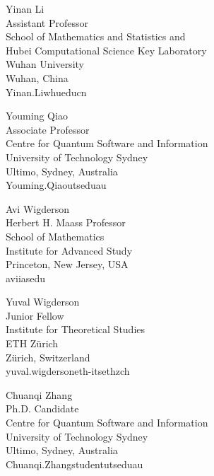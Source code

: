 \documentclass{toc}
\theoremstyle{plain}
\numberwithin{equation}{section}
\theoremstyle{definition}
\begin{document}
%
%
%
%
%
\begin{tocauthors}
\begin{tocinfo}[Li]
 Yinan Li\\
 Assistant Professor\\
 School of Mathematics and Statistics and \\
 Hubei Computational Science Key Laboratory\\
 Wuhan University\\
 Wuhan, China\\
 Yinan.Li\tocat{}whu\tocdot{}edu\tocdot{}cn \\   %
\end{tocinfo}
\begin{tocinfo}[Qiao]
  Youming Qiao\\
  Associate Professor\\
  Centre for Quantum Software and Information\\
  University of Technology Sydney\\
  Ultimo, Sydney, Australia\\
  Youming.Qiao\tocat{}uts\tocdot{}edu\tocdot{}au \\
\end{tocinfo}
\begin{tocinfo}[WigdersonA]
  Avi Wigderson\\
  Herbert H. Maass Professor\\
  School of Mathematics\\
  Institute for Advanced Study\\
  Princeton, New Jersey, USA\\
  avi\tocat{}ias\tocdot{}edu \\
\end{tocinfo}
\begin{tocinfo}[WigdersonY]
  Yuval Wigderson\\
  Junior Fellow\\
  Institute for Theoretical Studies\\
  ETH Z\"{u}rich\\
  Z\"{u}rich, Switzerland\\
  yuval.wigderson\tocat{}eth-its\tocdot{}ethz\tocdot{}ch
\end{tocinfo}
\begin{tocinfo}[Zhang]
  Chuanqi Zhang\\
  Ph.D. Candidate\\
  Centre for Quantum Software and Information\\
  University of Technology Sydney\\
  Ultimo, Sydney, Australia\\
  Chuanqi.Zhang\tocat{}student\tocdot{}uts\tocdot{}edu\tocdot{}au \\
\end{tocinfo}
\end{tocauthors}
\end{document}
